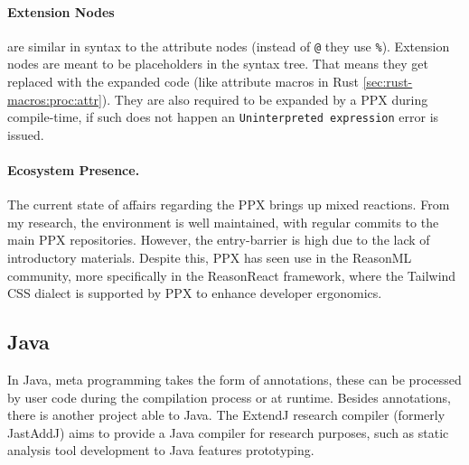 \paragraph{Extension Nodes} are similar in syntax to the attribute nodes (instead of \texttt{@} they use \texttt{\%}).
Extension nodes are meant to be placeholders in the syntax tree.
That means they get replaced with the expanded code (like attribute macros in Rust \autoref{sec:rust-macros:proc:attr}).
They are also required to be expanded by a \gls{PPX} during compile-time,
if such does not happen an \texttt{Uninterpreted expression} error is issued.

\begin{displayquote}
	\begin{compactitem}
		\item \texttt{[%
		\item \texttt{[%
	\end{compactitem}
\end{displayquote}

\paragraph{Ecosystem Presence.}
The current state of affairs regarding the \gls{PPX} brings up mixed reactions.
From my research, the environment is well maintained, with regular commits to the main \gls{PPX} repositories.
However, the entry-barrier is high due to the lack of introductory materials.
Despite this, \gls{PPX} has seen use in the ReasonML community, more specifically in the ReasonReact framework,
where the Tailwind CSS dialect is supported by \gls{PPX} to enhance developer ergonomics.

\subsection{Java}\label{sec:lang-preprocessors:java}

In Java, meta programming takes the form of annotations, these can be processed by user code during the compilation process or at runtime.
Besides annotations, there is another project able to  Java.
The ExtendJ research compiler (formerly JastAddJ) \autocite{Ekman2007} aims to provide a  Java compiler for research purposes,
such as static analysis tool development to Java features prototyping.

